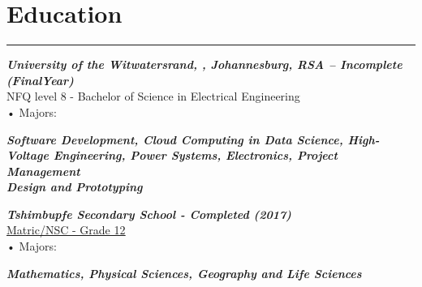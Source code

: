 \documentclass[12pt]{article}
\begin{document}
\vspace{-5mm} \section*{\fontsize{14}{1}\selectfont\color{color_29791}Education}\vspace{-10pt} 
\rule{\textwidth}{0.4pt}
\vspace{2pt}
{\textbf{\textit{\fontsize{12}{1}\selectfont\color{color_29791}University of the Witwatersrand, , Johannesburg, RSA – Incomplete (FinalYear)}}}\\
\fontsize{10}{1}\selectfont\color{color_29791}NFQ level 8 - Bachelor of Science in Electrical Engineering\\
{{\fontsize{10}{1}\selectfont\color{color_29791}\hspace{10mm}• Majors:}}
\parbox{\textwidth}{\raggedright
    \textbf{\textit{\fontsize{8}{1}\selectfont\color{color_29791}Software Development, Cloud Computing in Data Science, High-Voltage Engineering, Power Systems, Electronics, Project Management \\ Design and Prototyping}}
} \vspace{4pt}
\textbf{\textit{\fontsize{12}{1}\selectfont\color{color_29791}Tshimbupfe Secondary School - Completed (2017)}}\\
\fontsize{10}{1}\selectfont\color{color_29791}\href{https://drive.google.com/file/d/1i5SDy8WoBzwGOmAEAcxJzVyCb1c7Gfqq/view?usp=sharing}{\underline{Matric/NSC - Grade 12}}\\
{{\fontsize{10}{1}\selectfont\color{color_29791}\hspace{10mm}• Majors:}}
\parbox{\textwidth}{\raggedright
    \textbf{\textit{\fontsize{9}{1}\selectfont\color{color_29791}Mathematics, Physical Sciences, Geography and Life Sciences}}
}
\end{document}
